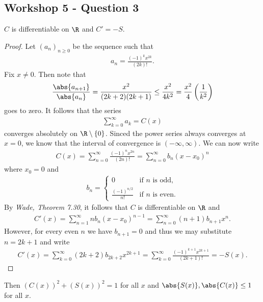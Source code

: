 \documentclass{article}
\begin{document}
\subsection*{Workshop 5 - Question 3}


\begin{claim*}
	$C$ is differentiable on $\R$ and $C'=-S$.
\end{claim*}
\begin{proof}
	Let $(a_n)_{n\geq 0}$ be the sequence such that
	\begin{align*}
		a_n = \frac{(-1)^{k}x^{2k}}{(2k)!}.
	\end{align*}
	Fix $x\not=0$. Then note that
	\begin{align*}
		\frac{\abs{a_{n+1}}}{\abs{a_n}} = \frac{x^2}{(2k+2)(2k+1)} \leq \frac{x^2}{4k^2} = \frac{x^2}{4}\left(\frac{1}{k^2}\right)
	\end{align*}
	goes to zero. It follows that the series
	\begin{align*}
		\sum_{k=0}^\infty a_k = C(x)
	\end{align*}
	converges absolutely on $\R\setminus\{0\}$.
	Sinced the power series always converges at $x=0$, we know that the interval of convergence is $(-\infty,\infty)$.
	We can now write
	\begin{align*}
		C(x) = \sum_{n=0}^\infty \frac{(-1)^{n}x^{2n}}{(2n)!} = \sum_{n=0}^\infty b_n(x-x_0)^n
	\end{align*}
	where $x_0=0$ and
	\begin{align*}
		b_n = \begin{cases}
			      0                     & \text{if $n$ is odd},  \\
			      \frac{(-1)^{n/2}}{n!} & \text{if $n$ is even}.
		      \end{cases}
	\end{align*}
	By \emph{Wade, Theorem 7.30}, it follows that $C$ is differentiable on $\R$ and
	\begin{align*}
		C'(x) = \sum_{n=1}^\infty nb_n(x-x_0)^{n-1} = \sum_{n=0}^\infty (n+1)b_{n+1}x^n.
	\end{align*}
	However, for every even $n$ we have $b_{n+1}=0$ and thus we may substitute $n=2k+1$ and write
	\begin{align*}
		C'(x) = \sum_{k=0}^\infty (2k+2)b_{2k+2}x^{2k+1}
		= \sum_{k=0}^\infty \frac{(-1)^{k+1}x^{2k+1}}{(2k+1)!}
		= -S(x).
	\end{align*}
\end{proof}

\begin{claim*}
	Then $(C(x))^2 + (S(x))^2 = 1$ for all $x$ and $\abs{S(x)},\abs{C(x)}\leq 1$
	for all $x$.
\end{claim*}
\end{document}
